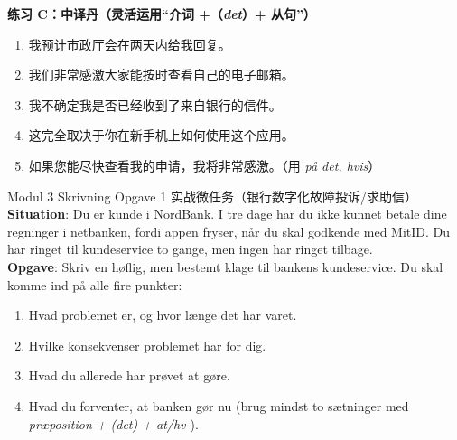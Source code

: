 \textbf{练习 C：中译丹（灵活运用“介词 +（\textit{det}）+ 从句”）}
\begin{enumerate}
  \item 我预计市政厅会在两天内给我回复。
  \item 我们非常感激大家能按时查看自己的电子邮箱。
  \item 我不确定我是否已经收到了来自银行的信件。
  \item 这完全取决于你在新手机上如何使用这个应用。
  \item 如果您能尽快查看我的申请，我将非常感激。（用 \textit{på det, hvis}）
\end{enumerate}


\begin{emailbox}{Modul 3 Skrivning Opgave 1 实战微任务（银行数字化故障投诉/求助信）}
\textbf{Situation}: Du er kunde i NordBank. I tre dage har du ikke kunnet betale dine regninger i netbanken, fordi appen fryser, når du skal godkende med MitID. Du har ringet til kundeservice to gange, men ingen har ringet tilbage.\\
\textbf{Opgave}: Skriv en høflig, men bestemt klage til bankens kundeservice. Du skal komme ind på alle fire punkter:
\begin{enumerate}
  \item Hvad problemet er, og hvor længe det har varet.
  \item Hvilke konsekvenser problemet har for dig.
  \item Hvad du allerede har prøvet at gøre.
  \item Hvad du forventer, at banken gør nu (brug mindst to sætninger med \textit{præposition + (det) + at/hv-}).
\end{enumerate}
\end{emailbox}

